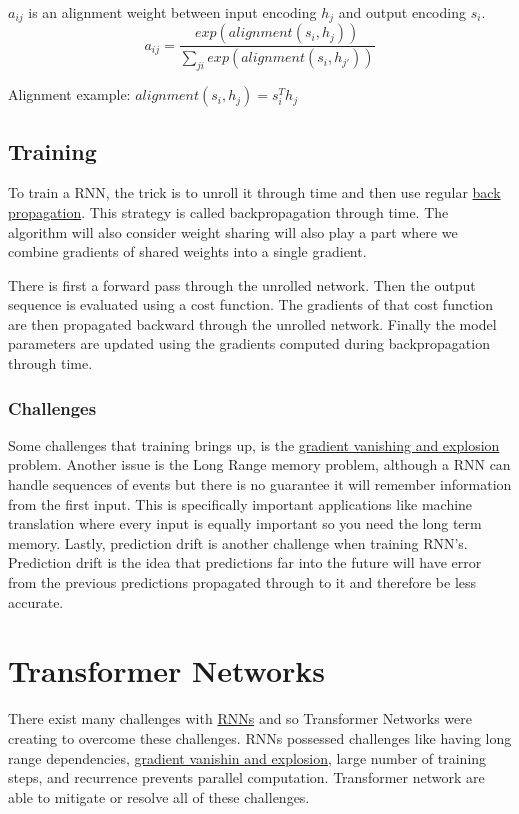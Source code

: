 \documentclass[12pt]{article}
\begin{document}
        $a_{ij}$ is an alignment weight between input encoding $h_j$ and output encoding $s_i$.
        $$ a_{ij} = \frac{exp(alignment(s_i, h_j))}{\sum_{ji} exp(alignment(s_i, h_{j'}))} $$

        Alignment example: $alignment(s_i, h_j) = s^T_i h_j$

    \subsection{Training}
        To train a RNN, the trick is to unroll it through time and then use regular \hyperref[sec:Backprop]{back
        propagation}. This strategy is called backpropagation through time. The algorithm will also consider weight sharing will also play a part where
        we combine gradients of shared weights into a single gradient. 
        
        There is first a forward pass through the unrolled network. Then the output sequence is evaluated using a cost
        function. The gradients of that cost function are then propagated backward through the unrolled network. Finally
        the model parameters are updated using the gradients computed during backpropagation through time. 

        \subsubsection{Challenges}
            Some challenges that training brings up, is the \hyperref[sec:VanishingProblem]{gradient vanishing and
            explosion} problem. Another issue is the Long Range memory problem, although a RNN can handle sequences of events
            but there is no guarantee it will remember information from the first input. This is specifically important
            applications like machine translation where every input is equally important so you need the long term memory.
            Lastly, prediction drift is another challenge when training RNN's. Prediction drift is the idea that predictions
            far into the future will have error from the previous predictions propagated through to it and therefore be
            less accurate.

\section{Transformer Networks}
    There exist many challenges with \hyperref[sec:RNN]{RNNs} and so Transformer Networks were creating to overcome
    these challenges. RNNs possessed challenges like having long range dependencies,
    \hyperref[sec:VanishingProblem]{gradient vanishin and explosion}, large number of training steps, and recurrence
    prevents parallel computation. Transformer network are able to mitigate or resolve all of these challenges.
\end{document}

